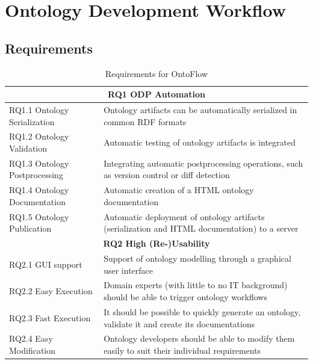 \documentclass[runningheads]{llncs}
\begin{document}
\section{Ontology Development Workflow}
\label{sec:ontoflow}
\subsection{Requirements}

\begin{table}[hbt]
	\caption{Requirements for OntoFlow}
	\renewcommand{\arraystretch}{1.3}
	\begin{tabular}{p{} p{}}
		\hline
		\multicolumn{2}{c}{\textbf{RQ1 ODP Automation}}                                                                                  \\
		\hline\hline
		RQ1.1 Ontology Serialization  & Ontology artifacts can be automatically serialized in common RDF formats                         \\

		RQ1.2 Ontology Validation     & Automatic testing of ontology artifacts is integrated                                            \\

		RQ1.3 Ontology Postprocessing & Integrating automatic postprocessing operations, such as version control or diff detection       \\

		RQ1.4 Ontology  Documentation & Automatic creation of a HTML ontology documentation                                              \\

		RQ1.5 Ontology Publication    & Automatic deployment of ontology artifacts (serialization and HTML documentation) to a server    \\
		\hline
		\multicolumn{2}{c}{\textbf{RQ2 High (Re-)Usability}}                                                                             \\
		\hline
		\hline
		RQ2.1 GUI support             & Support of ontology modelling through a graphical user interface                                 \\

		RQ2.2 Easy Execution          & Domain experts (with little to no IT background) should be able to trigger ontology workflows    \\

		RQ2.3 Fast Execution          & It should be possible to quickly generate an ontology, validate it and create its documentations \\

		RQ2.4 Easy Modification       & Ontology developers should be able to modify them easily to suit their individual requirements   \\
		\hline
	\end{tabular}
	\label{tab:req}
\end{table}
\end{document}
